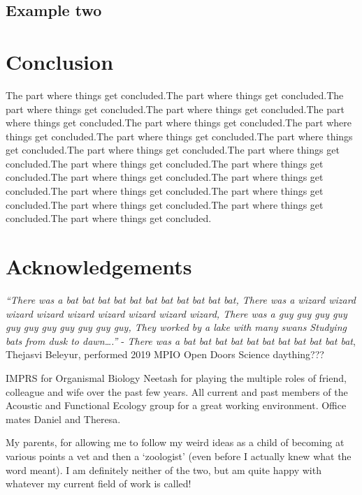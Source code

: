 \documentclass[
]{book}
\begin{document}
\hypertarget{example-two}{%
\section{Example two}\label{example-two}}

\hypertarget{conclusion}{%
\chapter{Conclusion}\label{conclusion}}

The part where things get concluded.The part where things get concluded.The part where things get concluded.The part where things get concluded.The part where things get concluded.The part where things get concluded.The part where things get concluded.The part where things get concluded.The part where things get concluded.The part where things get concluded.The part where things get concluded.The part where things get concluded.The part where things get concluded.The part where things get concluded.The part where things get concluded.The part where things get concluded.The part where things get concluded.The part where things get concluded.The part where things get concluded.The part where things get concluded.

\hypertarget{acknowledgements}{%
\chapter{Acknowledgements}\label{acknowledgements}}

\emph{``There was a bat bat bat bat bat bat bat bat bat bat bat,
\newline
There was a wizard wizard wizard wizard wizard wizard wizard wizard wizard,
\newline 
There was a guy guy guy guy guy guy guy guy guy guy guy,
\newline
They worked by a lake with many swans
\newline
Studying bats from dusk to dawn\ldots.''}
- \emph{There was a bat bat bat bat bat bat bat bat bat bat bat}, Thejasvi Beleyur, performed 2019 MPIO Open Doors Science daything???

IMPRS for Organismal Biology
Neetash for playing the multiple roles of friend, colleague and wife over the past few years.
All current and past members of the Acoustic and Functional Ecology group for a great working environment. Office mates Daniel and Theresa.

My parents, for allowing me to follow my weird ideas as a child of becoming at various points a vet and then a `zoologist' (even before I actually knew what the word meant). I am definitely neither of the two, but am quite happy with whatever my current field of work is called!
\end{document}

